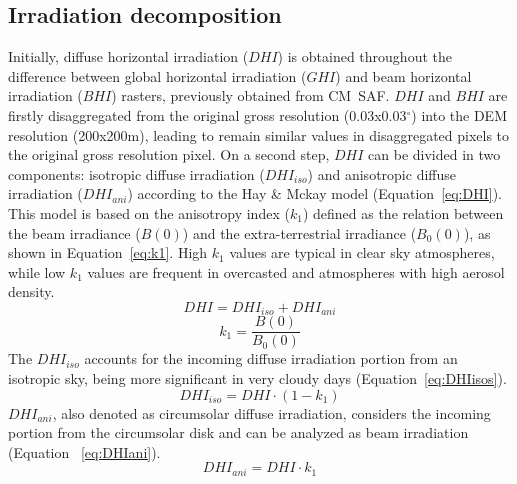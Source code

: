 \documentclass[authoryear, sort&compress]{elsarticle}
\begin{document}
\subsection{Irradiation decomposition}
\label{sec:irradDecomp}
Initially, diffuse horizontal irradiation ($DHI$) is obtained
throughout the difference between global horizontal irradiation
($GHI$) and beam horizontal irradiation ($BHI$) rasters,
previously obtained from CM~SAF.
$DHI$ and $BHI$ are firstly disaggregated from the original gross
resolution (0.03x0.03$^\circ$) into the DEM resolution (200x200m),
leading to remain similar values in disaggregated pixels to the
original gross resolution pixel.
On a second step, $DHI$ can be divided in two components:
isotropic diffuse irradiation ($DHI_{iso}$) and anisotropic
diffuse irradiation ($DHI_{ani}$) according to the Hay \& Mckay
model \citep{Hay.Mckay1985} (Equation~\ref{eq:DHI}). This model is
based on the anisotropy index ($k_{1}$) defined as the relation
between the beam irradiance ($B(0)$) and the extra-terrestrial
irradiance ($B_{0}(0)$), as shown in Equation~\ref{eq:k1}. High
$k_{1}$ values are typical in clear sky atmospheres, while low
$k_{1}$ values are frequent in overcasted and atmospheres with high
aerosol density.
\begin{equation}
\label{eq:DHI}
DHI=DHI_{iso}+DHI_{ani}
\end{equation}
\begin{equation}
\label{eq:k1}
k_{1}=\frac{B(0)}{B_{0}(0)} 
\end{equation}
The $DHI_{iso}$ accounts for the incoming diffuse irradiation
portion from an isotropic sky, being more significant in very
cloudy days (Equation~\ref{eq:DHIisos}).
\begin{equation}
\label{eq:DHIisos}
DHI_{iso}=DHI\cdot{}(1-k_{1})
\end{equation}
$DHI_{ani}$, also denoted as circumsolar diffuse irradiation,
considers the incoming portion from the circumsolar disk and can be
analyzed as beam irradiation \citep{Perpinan-Lamigueiro2013}
(Equation ~\ref{eq:DHIani}).
\begin{equation}
\label{eq:DHIani}
DHI_{ani}=DHI\cdot{}k_{1}
\end{equation}
\end{document}
